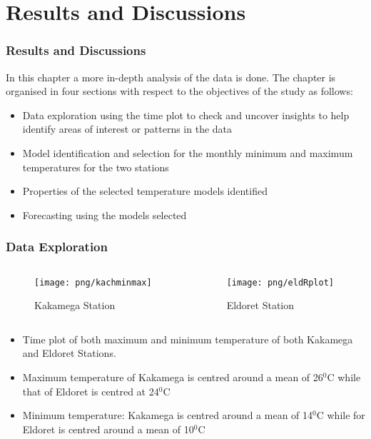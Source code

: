 \documentclass[]{beamer}
\begin{document}
\section{Results and Discussions}
\begin{frame}
\frametitle{Results and Discussions}
In this chapter a more in-depth analysis of the data is done. The chapter is organised in four sections with respect to the objectives of the study as follows:
\begin{itemize}
\item Data exploration using the time plot to check and uncover insights to help identify areas of interest or patterns in the data
\item Model identification and selection for the monthly minimum and maximum temperatures for the two stations
\item Properties of the selected temperature models identified
\item Forecasting using the models selected
\end{itemize}
\end{frame}
\begin{frame}
\frametitle{Data Exploration}
\fontsize{8pt}{7.2}\selectfont
\begin{columns}
	\begin{column}[t]{3cm}
		\begin{figure}
		\texttt{[image: png/kachminmax]}
		\caption{Kakamega Station}
		\end{figure}
	\end{column}
	\begin{column}[t]{3cm}
		\begin{figure}
		\texttt{[image: png/eldRplot]}
		\caption{Eldoret Station}
	\end{figure}
	\end{column}
\end{columns}
\begin{itemize}
\item Time plot of both maximum and minimum temperature of both Kakamega and Eldoret Stations. 
\item Maximum temperature of Kakamega is centred around a mean of 26$^{0}$C while that of Eldoret is centred at 24$ ^{0}$C
\item Minimum temperature: Kakamega is centred around a mean of 14$^{0} $C while for Eldoret is centred around a mean of 10$^{0}$C 		
\end{itemize}
\end{frame}
\end{document}
